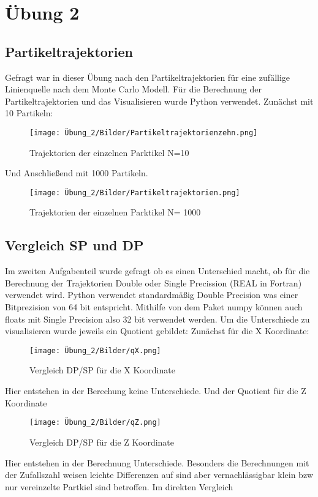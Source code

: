\documentclass[ngerman]{scrartcl}
\begin{document}
\section{Übung 2}
\subsection{Partikeltrajektorien}
Gefragt war in dieser Übung nach den Partikeltrajektorien für eine zufällige Linienquelle nach dem Monte Carlo Modell. Für die Berechnung der Partikeltrajektorien und das Visualisieren wurde Python verwendet.
Zunächst mit 10 Partikeln:
\begin{figure}[H]
    \centering
    \texttt{[image: Übung\_2/Bilder/Partikeltrajektorienzehn.png]}
    \caption{Trajektorien der einzelnen Parktikel N=10}
    \label{fig:my_label}
\end{figure}
Und Anschließend mit 1000 Partikeln.
\begin{figure}[H]
    \centering
    \texttt{[image: Übung\_2/Bilder/Partikeltrajektorien.png]}
    \caption{Trajektorien der einzelnen Parktikel N= 1000}
    \label{fig:my_label}
\end{figure}
\subsection{Vergleich SP und DP}
Im zweiten Aufgabenteil wurde gefragt ob es einen Unterschied macht, ob für die Berechnung der Trajektorien Double oder Single Precission (REAL in Fortran) verwendet wird. Python verwendet standardmäßig Double Precision was einer Bitprezision von 64 bit entspricht. Mithilfe von dem Paket numpy können auch floats mit Single Precision also 32 bit verwendet werden. Um die Unterschiede zu visualisieren wurde jeweils ein  Quotient gebildet:
Zunächst für die X Koordinate:
\begin{figure}[H]
    \centering
    \texttt{[image: Übung\_2/Bilder/qX.png]}
    \caption{Vergleich DP/SP für die X Koordinate}
    \label{fig:my_label}
\end{figure}
Hier entstehen in der Berechung keine Unterschiede.
Und der Quotient für die Z Koordinate
\begin{figure}[H]
    \centering
    \texttt{[image: Übung\_2/Bilder/qZ.png]}
    \caption{Vergleich DP/SP für die Z Koordinate}
    \label{fig:my_label}
\end{figure}
Hier entstehen in der Berechnung Unterschiede. Besonders die Berechnungen mit der Zufallszahl weisen leichte Differenzen auf sind aber vernachlässigbar klein bzw nur vereinzelte Partkiel sind betroffen. Im direkten Vergleich
\end{document}
